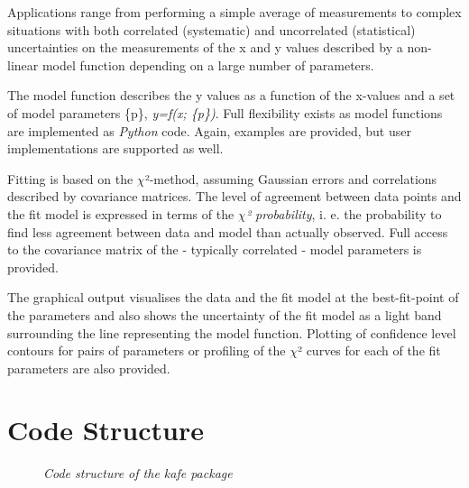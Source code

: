 \documentclass[a4paper,10pt,english]{sphinxmanual}
\begin{document}
Applications range from performing a simple average of measurements
to complex situations with both correlated (systematic) and
uncorrelated (statistical) uncertainties on the measurements
of the x and y values described by a non-linear model function
depending on a large number of parameters.

The model function describes the y values as a function of the
x-values and a set of model parameters \{p\}, \emph{y=f(x; \{p\})}. Full
flexibility exists as model functions are implemented as
\emph{Python} code. Again, examples are provided, but user
implementations are supported as well.

Fitting is based on the \(\chi\)²-method, assuming Gaussian errors and
correlations described by covariance matrices. The level of agreement
between data points and the fit model is expressed in terms of the
\emph{\(\chi\)² probability}, i. e. the probability to find less agreement between
data and model than actually observed. Full access to the covariance
matrix of the - typically correlated - model parameters is provided.

The graphical output visualises the data and the fit model at the
best-fit-point of the parameters and also shows the uncertainty
of the fit model as a light band surrounding the line representing
the model function. Plotting of confidence level contours for pairs
of parameters or profiling of the \(\chi\)² curves for each of the fit
parameters are also provided.


\section{Code Structure}
\label{index:code-structure}\begin{figure}[htbp]\begin{flushright}
\capstart

\caption{\emph{Code structure of the kafe package}}\end{flushright}\end{figure}
\end{document}
